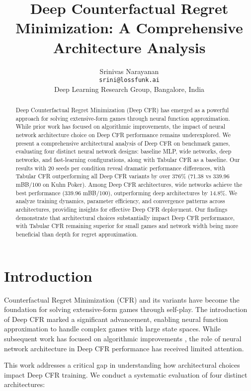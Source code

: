 \documentclass{article}
\title{\large \bf Deep Counterfactual Regret Minimization: A Comprehensive Architecture Analysis}
\author{
Srinivas Narayanan \\
\texttt{srini@lossfunk.ai} \\
Deep Learning Research Group, Bangalore, India
}
\date{}
\begin{document}
\maketitle

\begin{abstract}
Deep Counterfactual Regret Minimization (Deep CFR) has emerged as a powerful approach for solving extensive-form games through neural function approximation. While prior work has focused on algorithmic improvements, the impact of neural network architecture choice on Deep CFR performance remains underexplored. We present a comprehensive architectural analysis of Deep CFR on benchmark games, evaluating four distinct neural network designs: baseline MLP, wide networks, deep networks, and fast-learning configurations, along with Tabular CFR as a baseline. Our results with 20 seeds per condition reveal dramatic performance differences, with Tabular CFR outperforming all Deep CFR variants by over 376\% (71.38 vs 339.96 mBB/100 on Kuhn Poker). Among Deep CFR architectures, wide networks achieve the best performance (339.96 mBB/100), outperforming deep architectures by 14.8\%. We analyze training dynamics, parameter efficiency, and convergence patterns across architectures, providing insights for effective Deep CFR deployment. Our findings demonstrate that architectural choices substantially impact Deep CFR performance, with Tabular CFR remaining superior for small games and network width being more beneficial than depth for regret approximation.
\end{abstract}

\section{Introduction}

Counterfactual Regret Minimization (CFR) \cite{zinkevich2007regret} and its variants have become the foundation for solving extensive-form games through self-play. The introduction of Deep CFR \cite{brown2019deep} marked a significant advancement, enabling neural function approximation to handle complex games with large state spaces. While subsequent work has focused on algorithmic improvements \cite{brown2019superhuman,mcaleer2022anytime}, the role of neural network architecture in Deep CFR performance has received limited attention.

This work addresses a critical gap in understanding how architectural choices impact Deep CFR training. We conduct a systematic evaluation of four distinct architectures:
\end{document}
